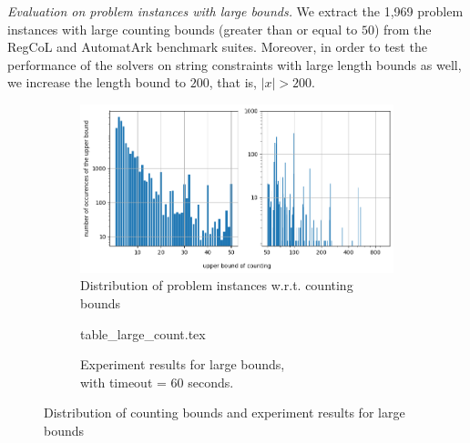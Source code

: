 \smallskip
\noindent
\emph{Evaluation on problem instances with large bounds.}
%
We extract the 1,969 problem instances with large counting bounds (greater than or equal to $50$) from the RegCoL and AutomatArk benchmark suites.  
Moreover, in order to test the performance of the solvers on string constraints with large length bounds as well, we increase the length bound to $200$, that is, $|x| > 200$.
%
\begin{figure}[ht]
  \centering
  \begin{subfigure}[t]{0.49\textwidth}
    \centering\vskip 0pt
    \includegraphics[width=1\textwidth]{counting_distribution.png}  
    \caption{Distribution of problem instances w.r.t. counting bounds}  
    \label{fig:count_distri}
  \end{subfigure}
  \hfill
  \begin{subfigure}[t]{0.49\textwidth}
    \centering\vskip 0pt
    {table_large_count.tex}
    \vspace{4.5mm}
    \caption{Experiment results for large bounds, \\with timeout = 60 seconds.}
    \label{fig:table_large_count}
  \end{subfigure}
  \vspace{-2mm}
  \caption{Distribution of counting bounds and experiment results for large bounds}
\vspace{-5mm}
\end{figure}




